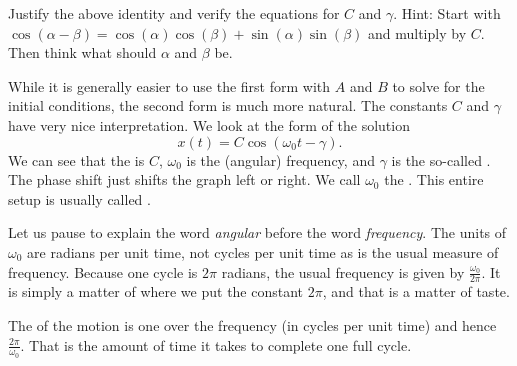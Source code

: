\begin{exercise}
Justify the above identity and verify the equations for $C$
and $\gamma$.  Hint: Start with
$\cos (\alpha-\beta) = \cos (\alpha) \cos
(\beta) + \sin (\alpha)\sin (\beta)$ and multiply by $C$.  Then think what should
$\alpha$ and $\beta$ be.
\end{exercise}

While it is generally easier to use the first form with $A$ and $B$
to solve for the initial conditions, the second form is much
more natural.  The constants $C$ and $\gamma$ have very nice interpretation.
We look at the form of the solution
\begin{equation*}
x(t) = C \cos ( \omega_0 t - \gamma ) .
\end{equation*}
We can see that the \emph{} is $C$, $\omega_0$ is the (angular)
frequency, and $\gamma$ is the so-called \emph{}.
The phase shift just shifts the
graph left or right.
We call $\omega_0$ the \emph{}.
This entire setup is usually  
called \emph{}.

Let us pause to explain the word \emph{angular}
before the word \emph{frequency}.
The units of
$\omega_0$ are radians per unit time, not cycles per unit time 
as is the usual measure of frequency.  Because one cycle is $2
\pi$ radians, the usual frequency is given by $\frac{\omega_0}{2\pi}$.
It is simply a matter of where we put the constant $2\pi$, and that is a
matter of taste.

The \emph{} of the motion is one over the frequency (in cycles per unit
time) and hence $\frac{2\pi}{\omega_0}$.  That is the amount of time it takes
to complete one full cycle.


